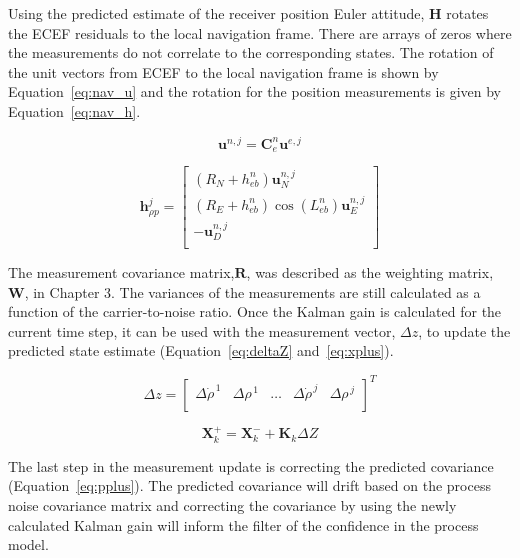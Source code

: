 Using the predicted estimate of the receiver position Euler attitude, \(\mathbf{H}\) rotates the ECEF residuals to the local navigation frame. There are arrays of zeros where the measurements do not correlate to the corresponding states. The rotation of the unit vectors from ECEF to the local navigation frame is shown by Equation~\ref{eq:nav_u} and the rotation for the position measurements is given by Equation~\ref{eq:nav_h}.

\begin{equation}\label{eq:nav_u}
    \mathbf{u}^{n,j} = \mathbf{C}_e^n \mathbf{u}^{e,j}
\end{equation}

\begin{equation}\label{eq:nav_h}
    \mathbf{h}^j_{\rho p} =
    \begin{bmatrix}
        \left(R_N + h^n_{eb}\right)\mathbf{u}^{n,j}_N               \\
        \left(R_E + h_{eb}^n\right)\cos(L^n_{eb})\mathbf{u}^{n,j}_E \\
        -\mathbf{u}^{n,j}_D                                         \\
    \end{bmatrix}
\end{equation}

The measurement covariance matrix,\(\mathbf{R}\), was described as the weighting matrix, \(\mathbf{W}\), in Chapter 3. The variances of the measurements are still calculated as a function of the carrier-to-noise ratio. Once the Kalman gain is calculated for the current time step, it can be used with the measurement vector, \(\Delta z\), to update the predicted state estimate (Equation~\ref{eq:deltaZ} and~\ref{eq:xplus}).

\begin{equation}\label{eq:deltaZ}
    \Delta z = \begin{bmatrix}
        \Delta\dot{\rho}^{\,1} & \Delta{\rho}^{\,1} & \hdots & \Delta\dot{\rho}^{\,j} & \Delta{\rho}^{\,j} \\
    \end{bmatrix}^T
\end{equation}

\begin{equation}\label{eq:xplus}
    \mathbf{X}_k^+ = \mathbf{X}^-_k + \mathbf{K}_k\Delta Z
\end{equation}

The last step in the measurement update is correcting the predicted covariance (Equation~\ref{eq:pplus}). The predicted covariance will drift based on the process noise covariance matrix and correcting the covariance by using the newly calculated Kalman gain will inform the filter of the confidence in the process model.

